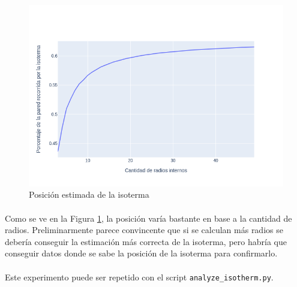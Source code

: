 \documentclass[12pt]{article}
\begin{document}
\begin{figure}[H]
\centering
\includegraphics[scale=0.5]{isotherm_by_radii}
\caption{Posición estimada de la isoterma}
\label{fig:isotherm_by_radii}
\end{figure}

\paragraph{} Como se ve en la Figura \ref{fig:isotherm_by_radii}, la posición varía bastante en base a la cantidad de radios. Preliminarmente parece convincente que si se calculan más radios se debería conseguir la estimación más correcta de la isoterma, pero habría que conseguir datos donde se sabe la posición de la isoterma para confirmarlo.

\paragraph{} Este experimento puede ser repetido con el script \texttt{analyze\_isotherm.py}.


\end{document}

